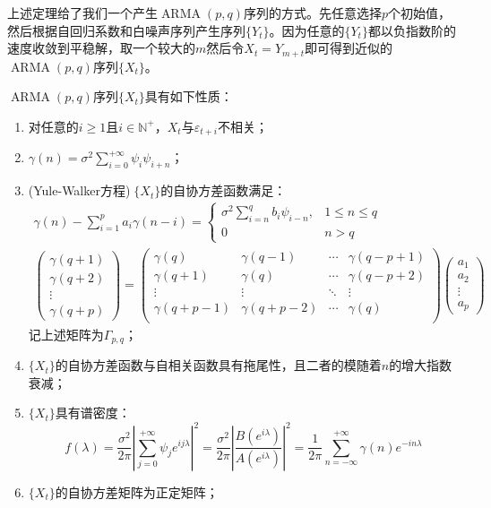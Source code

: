\begin{note}
	上述定理给了我们一个产生$\operatorname{ARMA}(p,q)$序列的方式。先任意选择$p$个初始值，然后根据自回归系数和白噪声序列产生序列$\{Y_t\}$。因为任意的$\{Y_t\}$都以负指数阶的速度收敛到平稳解，取一个较大的$m$然后令$X_t=Y_{m+t}$即可得到近似的$\operatorname{ARMA}(p,q)$序列$\{X_t\}$。
\end{note}
\begin{property}
	$\operatorname{ARMA}(p,q)$序列$\{X_t\}$具有如下性质：
	\begin{enumerate}
		\item 对任意的$i\geqslant1$且$i\in\mathbb{N}^+$，$X_t$与$\varepsilon_{t+i}$不相关；
		\item $\gamma(n)=\sigma^2\sum\limits_{i=0}^{+\infty}\psi_i\psi_{i+n}$；
		\item (Yule-Walker方程)$\;\{X_t\}$的自协方差函数满足：
		\begin{gather*}
			\gamma(n)-\sum_{i=1}^{p}a_i\gamma(n-i)=
			\begin{cases}
				\sigma^2\sum\limits_{i=n}^{q}b_i\psi_{i-n},&1\leqslant n\leqslant q \\
				0 & n>q
			\end{cases} \\
			\begin{pmatrix}
				\gamma(q+1) \\
				\gamma(q+2) \\
				\vdots \\
				\gamma(q+p)
			\end{pmatrix}=
			\begin{pmatrix}
				\gamma(q) & \gamma(q-1) & \cdots & \gamma(q-p+1) \\
				\gamma(q+1) & \gamma(q) & \cdots & \gamma(q-p+2) \\
				\vdots & \vdots & \ddots & \vdots \\
				\gamma(q+p-1) & \gamma(q+p-2) & \cdots & \gamma(q) \\
			\end{pmatrix}
			\begin{pmatrix}
				a_1 \\
				a_2 \\
				\vdots \\
				a_p
			\end{pmatrix}
		\end{gather*}
		记上述矩阵为$\Gamma_{p,q}$；
		\item $\{X_t\}$的自协方差函数与自相关函数具有拖尾性，且二者的模随着$n$的增大指数衰减；
		\item $\{X_t\}$具有谱密度：
		\begin{equation*}
			f(\lambda)=\frac{\sigma^2}{2\pi}\left|\sum_{j=0}^{+\infty}\psi_je^{ij\lambda}\right|^2=\frac{\sigma^2}{2\pi}\left|\frac{B(e^{i\lambda})}{A(e^{i\lambda})}\right|^2=\frac{1}{2\pi}\sum_{n=-\infty}^{+\infty}\gamma(n)e^{-in\lambda}
		\end{equation*}
		\item $\{X_t\}$的自协方差矩阵为正定矩阵；
	\end{enumerate}
\end{property}
